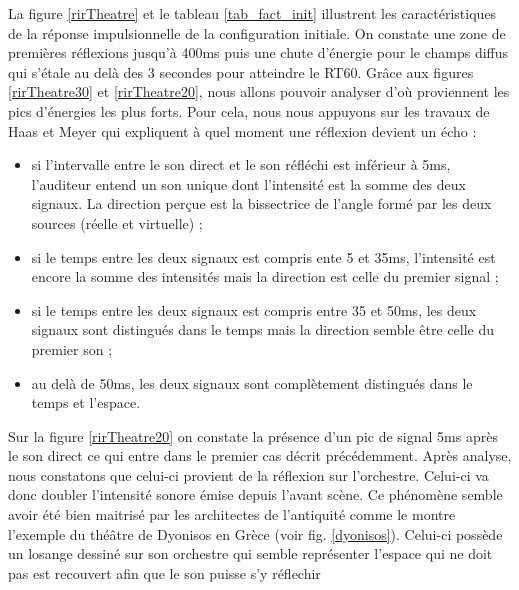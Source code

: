 La figure \ref{rirTheatre} et le tableau \ref{tab_fact_init} illustrent les caractéristiques de  la réponse impulsionnelle de la configuration initiale. On constate une zone de premières réflexions jusqu'à 400ms puis une chute d'énergie pour le champs diffus qui s'étale au delà des 3 secondes pour atteindre le \gls{RT60}. Grâce aux figures \ref{rirTheatre30} et \ref{rirTheatre20}, nous allons pouvoir analyser d'où proviennent les pics d'énergies les plus forts. Pour cela, nous nous appuyons sur les travaux de Haas et Meyer \cite[p.49]{haas} qui expliquent à quel moment une réflexion devient un écho :
\begin{itemize}
\item si l'intervalle entre le son direct et le son réfléchi est inférieur à 5ms, l'auditeur entend un son unique dont l'intensité est la somme des deux signaux. La direction perçue est la bissectrice de l'angle formé par les deux sources (réelle et virtuelle) ;
\item si le temps entre les deux signaux est compris ente 5 et 35ms, l'intensité est encore la somme des intensités mais la direction est celle du premier signal ;
\item si le temps entre les deux signaux est compris entre 35 et 50ms, les deux signaux sont distingués dans le temps mais la direction semble être celle du premier son ;
\item au delà de 50ms, les deux signaux sont complètement distingués dans le temps et l'espace.
\end{itemize}
Sur la figure \ref{rirTheatre20} on constate la présence d'un pic de signal 5ms après le son direct ce qui entre dans le premier cas décrit précédemment. Après analyse, nous constatons que celui-ci provient de la réflexion sur l'orchestre. Celui-ci va donc doubler l'intensité sonore émise depuis l'avant scène. Ce phénomène semble avoir été bien maitrisé par les architectes de l'antiquité comme le montre l'exemple du théâtre de Dyonisos en Grèce (voir fig. \ref{dyonisos}). Celui-ci possède un losange dessiné sur son orchestre qui semble représenter l'espace qui ne doit pas est recouvert afin que le son puisse s'y réflechir \cite[p.118-120]{canac} 
